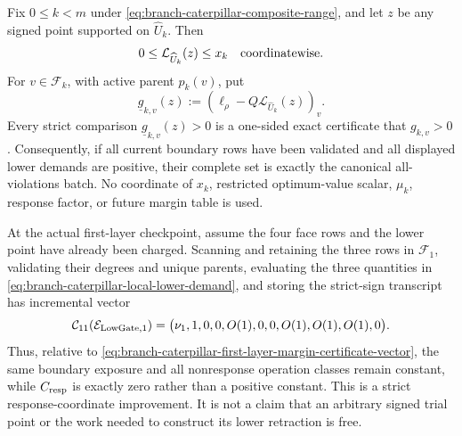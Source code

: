 \begin{lemma}
\label{lem:branch-caterpillar-local-lower-gate-certificate}
Fix $0\leq k<m$ under
\cref{eq:branch-caterpillar-composite-range}, and let $z$ be any signed point
supported on $\widehat U_k$.  Then
\begin{equation}
 0\leq\mathcal L_{\widehat U_k}(z)\leq x_k
 \quad\hbox{coordinatewise}.
 \label{eq:branch-caterpillar-local-lower-order}
\end{equation}
For $v\in\mathcal F_k$, with active parent $p_k(v)$, put
\begin{equation}
 \underline g_{k,v}(z):=
  (\ell_\rho-Q\mathcal L_{\widehat U_k}(z))_v.
 \label{eq:branch-caterpillar-local-lower-demand}
\end{equation}
Every strict comparison $\underline g_{k,v}(z)>0$ is a one-sided exact
certificate that $g_{k,v}>0$.  Consequently, if all current boundary rows
have been validated and all displayed lower demands are positive, their
complete set is exactly the canonical all-violations batch.  No coordinate of
$x_k$, restricted optimum-value scalar, $\mu_k$, response factor, or future
margin table is used.

At the actual first-layer checkpoint, assume the four face rows and the lower
point have already been charged.  Scanning and retaining the three rows in
$\mathcal F_1$, validating their degrees and unique parents, evaluating the
three quantities in
\cref{eq:branch-caterpillar-local-lower-demand}, and storing the strict-sign
transcript has incremental vector
\begin{equation}
 \mathcal C_{11}(\mathcal E_{\rm LowGate,1})
 =\bigl(\nu_1,1,0,0,O(1),0,0,
         O(1),O(1),O(1),0\bigr).
 \label{eq:branch-caterpillar-local-lower-certificate-vector}
\end{equation}
Thus, relative to
\cref{eq:branch-caterpillar-first-layer-margin-certificate-vector}, the same
boundary exposure and all nonresponse operation classes remain constant,
while $C_{\rm resp}$ is exactly zero rather than a positive constant.  This
is a strict response-coordinate improvement.  It is not a claim that an
arbitrary signed trial point or the work needed to construct its lower
retraction is free.
\end{lemma}


